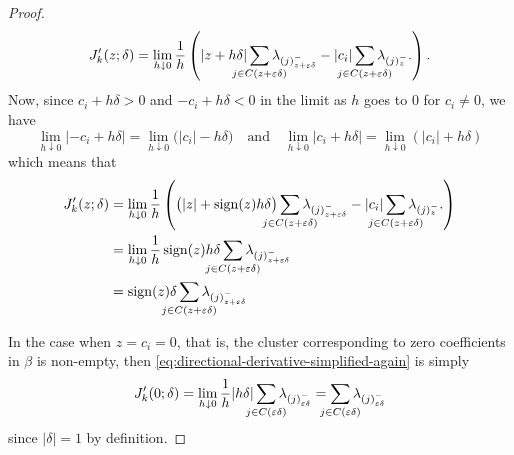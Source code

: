 \begin{proof}
\begin{equation}
    \label{eq:directional-derivative-simplified-again}
    J'_k(z; \delta)
    = \lim_{h \downarrow 0} \frac{1}{h}
    \left(
      |z + h\delta|\smashoperator{\sum_{j \in C(z + \varepsilon\delta)}} \lambda_{(j)^-_{z + \varepsilon\delta}}
      - |c_i| \smashoperator{\sum_{j \in C(z + \varepsilon\delta)}} \lambda_{(j)^-_{z}}.
    \right).
  \end{equation}
  Now, since \(c_i + h \delta > 0\) and \(-c_i + h \delta < 0\) in the limit as
  \(h\) goes to \(0\) for \(c_i \neq 0\), we have
  \[
    \lim_{h\downarrow 0} |-c_i + h \delta|
    = \lim_{h\downarrow 0}\big( |c_i| -h \delta\big)
    \quad\text{and}\quad
    \lim_{h\downarrow 0} |c_i + h \delta|
    = \lim_{h\downarrow 0}(|c_i| + h \delta)
  \]
  which means that
  \begin{align*}
    J'_k(z; \delta)
     & = \lim_{h \downarrow 0} \frac{1}{h}
    \left(
      \big(|z| + \sign(z)h\delta\big)\smashoperator{\sum_{j \in C(z + \varepsilon\delta)}} \lambda_{(j)^-_{z + \varepsilon\delta}}
      - |c_i| \smashoperator{\sum_{j \in C(z + \varepsilon\delta)}} \lambda_{(j)^-_{z}}.
    \right)                                                                                                          \\
     & = \lim_{h \downarrow 0} \frac{1}{h}
    \sign(z)h\delta\smashoperator{\sum_{j \in C(z + \varepsilon\delta)}} \lambda_{(j)^-_{z + \varepsilon\delta}}     \\
     & = \sign(z)\delta\smashoperator{\sum_{j \in C(z + \varepsilon\delta)}} \lambda_{(j)^-_{z + \varepsilon\delta}} \\
  \end{align*}

  In the case when \(z = c_i = 0\), that is, the cluster corresponding to
  zero coefficients in \(\beta\) is non-empty,
  then \eqref{eq:directional-derivative-simplified-again} is
  simply
  \begin{equation*}
    \label{eq:directional-derivative-zerocase}
    J'_k(0; \delta)
    = \lim_{h \downarrow 0} \frac{1}{h}
    |h\delta|\smashoperator{\sum_{j \in C(\varepsilon\delta)}} \lambda_{(j)^-_{\varepsilon\delta}}
    = \smashoperator{\sum_{j \in C(\varepsilon\delta)}} \lambda_{(j)^-_{\varepsilon\delta}}
  \end{equation*}
  since \(|\delta| = 1\) by definition.


\end{proof}
